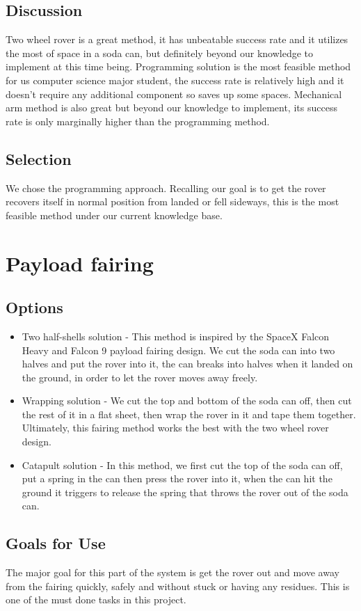 \documentclass[10pt,letterpaper,onecolumn,journal]{IEEEtran}
\begin{document}
\subsection{Discussion}
Two wheel rover is a great method, it has unbeatable success rate and it utilizes the most of space in a soda can, but definitely beyond our knowledge to implement at this time being. Programming solution is the most feasible method for us computer science major student, the success rate is relatively high and it doesn't require any additional component so saves up some spaces. Mechanical arm method is also great but beyond our knowledge to implement, its success rate is only marginally higher than the programming method. 

\subsection{Selection}
We chose the programming approach. Recalling our goal is to get the rover recovers itself in normal position from landed or fell sideways, this is the most feasible method under our current knowledge base. 

\section{Payload fairing}
\subsection{Options}
\begin{itemize}
	\item Two half-shells solution\cite{SpaceX} - This method is inspired by the SpaceX Falcon Heavy and Falcon 9 payload fairing design. We cut the soda can into two halves and put the rover into it, the can breaks into halves when it landed on the ground, in order to let the rover moves away freely. 
	\item Wrapping solution - We cut the top and bottom of the soda can off, then cut the rest of it in a flat sheet, then wrap the rover in it and tape them together. Ultimately, this fairing method works the best with the two wheel rover design.  
	\item Catapult solution - In this method, we first cut the top of the soda can off, put a spring in the can then press the rover into it, when the can hit the ground it triggers to release the spring that throws the rover out of the soda can. 
\end{itemize}
\subsection{Goals for Use}
The major goal for this part of the system is get the rover out and move away from the fairing quickly, safely and without stuck or having any residues. This is one of the must done tasks in this project.  
\end{document}
